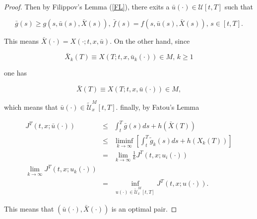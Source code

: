 \begin{proof}
Then by Filippov's Lemma (\ref{FL}), there exits a $\bar{u}(\cdot)\in \mathcal{U}[t,T]$ such that

$$\bar{g}(s)\geq g(s,\bar{u}(s),\bar{X}(s)),\,\bar{f}(s)=f(s,\bar{u}(s),\bar{X}(s)),\, s\in [t,T].$$

This means $\bar{X}(\cdot)=X(\cdot;t,x,\bar{u})$. On the other hand, since

$$\bar{X}_k(T)\equiv X(T;t,x,\bar{u}_k(\cdot))\in M,\, k\geq 1$$

one has 

$$\bar{X}(T)\equiv X(T;t,x,\bar{u}(\cdot))\in M,$$

which means that $\bar{u}(\cdot)\in \tilde{\mathcal{U}}^M_x[t,T]$. finally, by Fatou's Lemma

\begin{eqnarray*}
J^T(t,x;\bar{u}(\cdot))&\leq& \int_{t}^{T}\bar{g}(s)ds +h(\bar{X}(T))\\
&\leq& \liminf_{k\rightarrow \infty}[\int_{t}^{T}\tilde{g}_k(s)ds+h(X_k(T))]\\
&=&\lim_{k\rightarrow \infty} \frac{1}{k}J^T(t,x;u_i(\cdot))\\
\lim_{k\rightarrow \infty} J^T(t,x;u_k(\cdot))\\
&=& \inf_{u(\cdot)\in\tilde{\mathcal{U}}^M_x[t,T]}J^T(t,x;u(\cdot)).
\end{eqnarray*}

This means that $(\bar{u}(\cdot),\bar{X}(\cdot))$ is an optimal pair.

\end{proof}









